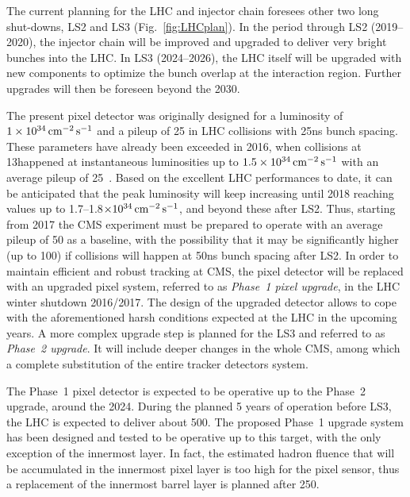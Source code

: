 The current planning for the LHC and injector chain foresees other two long shut-downs, LS2 and LS3 (Fig.~\ref{fig:LHCplan}).
In the period through LS2 (2019--2020), the injector chain will be improved and upgraded to deliver very bright bunches into the LHC.
In LS3 (2024--2026), the LHC itself will be upgraded with new components to optimize the bunch overlap at the interaction region. 
Further upgrades will then be foreseen beyond the 2030.

The present pixel detector was originally designed for a luminosity of $1\times10^{34}\,\text{cm}^\text{$-$2}\,\text{s}^\text{$-$1}$ and a pileup of 25 in LHC collisions with 25\unit{ns} bunch spacing.
These parameters have already been exceeded in 2016, when collisions at 13\TeV happened at instantaneous luminosities up to $1.5\times10^{34}\,\text{cm}^\text{$-$2}\,\text{s}^\text{$-$1}$ with an average pileup of 25~\cite{LumiPublicResults}.
Based on the excellent LHC performances to date, it can be anticipated that the peak luminosity will keep increasing until 2018 reaching values up to 1.7--1.8$\times10^{34}\,\text{cm}^\text{$-$2}\,\text{s}^\text{$-$1}$, and beyond these after LS2.
Thus, starting from 2017 the CMS experiment must be prepared to operate with an average pileup of 50 as a baseline,
with the possibility that it may be significantly higher (up to 100) if collisions will happen at 50\unit{ns} bunch spacing after LS2.
In order to maintain efficient and robust tracking at CMS, the pixel detector will be replaced with an upgraded pixel system, referred to as {\it Phase~1 pixel upgrade}, in the LHC winter shutdown 2016/2017.
The design of the upgraded detector allows to cope with the aforementioned harsh conditions expected at the LHC in the upcoming years.
A more complex upgrade step is planned for the LS3 and referred to as {\it Phase~2 upgrade}. It will include deeper changes in the whole CMS, among which a complete substitution of the entire tracker detectors system.

The Phase~1 pixel detector is expected to be operative up to the Phase~2 upgrade, around the 2024.
During the planned 5 years of operation before LS3, the LHC is expected to deliver about 500\fbinv.
The proposed Phase~1 upgrade system has been designed and tested to be operative up to this target, with the only exception of the innermost layer.
In fact, the estimated hadron fluence that will be accumulated in the innermost pixel layer is too high for the pixel sensor, thus a replacement of the innermost barrel layer is planned after 250\fbinv.

